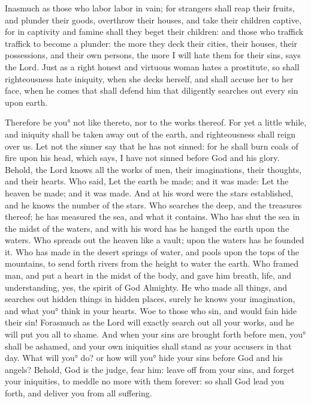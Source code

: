 {Inasmuch as those who labor labor in vain;
for strangers shall reap their fruits, and plunder their goods, overthrow their houses, and take their children captive, for in captivity and famine shall they beget their children:
and those who traffick traffick to become a plunder: the more they deck their cities, their houses, their possessions, and their own persons,
the more I will hate them for their sins, says the Lord.
Just as a right honest and virtuous woman hates a prostitute,
so shall righteousness hate iniquity, when she decks herself, and shall accuse her to her face, when he comes that shall defend him that diligently searches out every sin upon earth.
\par }{\PP {}Therefore be you° not like thereto, nor to the works thereof.
For yet a little while, and iniquity shall be taken away out of the earth, and righteousness shall reign over us.
Let not the sinner say that he has not sinned: for he shall burn coals of fire upon his head, which says, I have not sinned before God and his glory.
Behold, the Lord knows all the works of men, their imaginations, their thoughts, and their hearts.
Who said, Let the earth be made; and it was made: Let the heaven be made; and it was made.
And at his word were the stars established, and he knows the number of the stars.
Who searches the deep, and the treasures thereof; he has measured the sea, and what it contains.
Who has shut the sea in the midst of the waters, and with his word has he hanged the earth upon the waters.
Who spreads out the heaven like a vault; upon the waters has he founded it.
Who has made in the desert springs of water, and pools upon the tops of the mountains, to send forth rivers from the height to water the earth.
Who framed man, and put a heart in the midst of the body, and gave him breath, life, and understanding,
yes, the spirit of God Almighty. He who made all things, and searches out hidden things in hidden places,
surely he knows your imagination, and what you° think in your hearts. Woe to those who sin, and would fain hide their sin!
Forasmuch as the Lord will exactly search out all your works, and he will put you all to shame.
And when your sins are brought forth before men, you° shall be ashamed, and your own iniquities shall stand as your accusers in that day.
What will you° do? or how will you° hide your sins before God and his angels?
Behold, God is the judge, fear him: leave off from your sins, and forget your iniquities, to meddle no more with them forever: so shall God lead you forth, and deliver you from all suffering.
}
